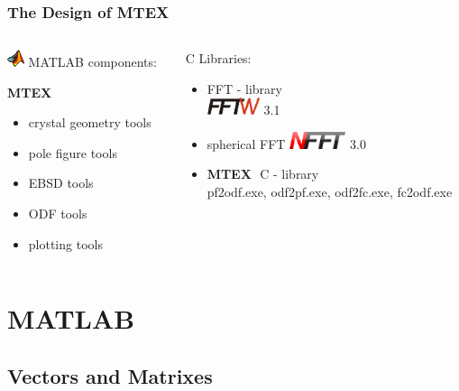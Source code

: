 \documentclass{beamer}
\newcommand{\mtex}{{\large \bf{\color{red}M}TEX\,}}%
\newcommand{\MTEX}{{\bf {\color{red}M}TEX\,}}%
\begin{document}
\begin{frame} 
  \frametitle{The Design of \MTEX}

  \begin{columns}
    \begin{column}[t]{4.5cm}
      \includegraphics[width = 5mm]{pic/matlab}
      MATLAB  components:\\
      \medskip

      \mtex
      \begin{itemize}
      \item crystal geometry tools
      \item pole figure tools
      \item EBSD tools
      \item ODF tools
      \item plotting tools
      \end{itemize}
    \end{column}
    \begin{column}[t]{4.5cm}
      C Libraries:
      \begin{itemize}
      \item FFT - library\\
        \includegraphics[height = 5mm]{pic/fftw-logo-med} 3.1
      \item spherical FFT
        \includegraphics[height = 5mm]{pic/nfft_logo} 3.0
      \item \mtex\ C - library\\
        pf2odf.exe, odf2pf.exe, odf2fc.exe, fc2odf.exe
      \end{itemize}
    \end{column}
  \end{columns}
\end{frame}

\section{MATLAB}

\subsection{Vectors and Matrixes}
\end{document}
